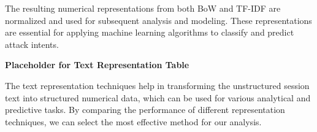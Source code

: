         The resulting numerical representations from both BoW and TF-IDF are normalized and used for subsequent analysis and modeling. These representations are essential for applying machine learning algorithms to classify and predict attack intents.

        \textbf{Placeholder for Text Representation Table}

        The text representation techniques help in transforming the unstructured session text into structured numerical data, which can be used for various analytical and predictive tasks. By comparing the performance of different representation techniques, we can select the most effective method for our analysis.

